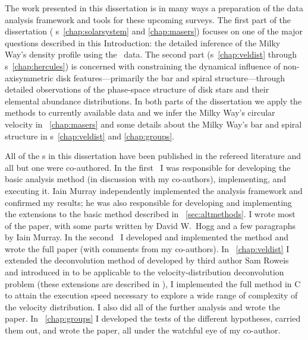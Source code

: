 The work presented in this dissertation is in many ways a preparation
of the data analysis framework and tools for these upcoming
surveys. The first part of the dissertation (\chaptername
s~\ref{chap:solarsystem} and \ref{chap:masers}) focuses on one
of the major questions described in this Introduction: the detailed
inference of the Milky Way's density profile using the \Gaia\
data. The second part (\chaptername s~\ref{chap:veldist}
through \chaptername s~\ref{chap:hercules}) is concerned with
constraining the dynamical influence of non-axisymmetric disk
features---primarily the bar and spiral structure---through detailed
observations of the phase-space structure of disk stars and their
elemental abundance distributions. In both parts of the dissertation
we apply the methods to currently available data and we infer the
Milky Way's circular velocity in \chaptername~\ref{chap:masers} and
some details about the Milky Way's bar and spiral structure
in \chaptername s~\ref{chap:veldist} and \ref{chap:groups}. 

All of the \chaptername s in this dissertation have been published in
the refereed literature and all but one were co-authored. In the
first \chaptername\ I was responsible for developing the basic
analysis method (in discussion with my co-authors), implementing, and
executing it. Iain Murray independently implemented the analysis
framework and confirmed my results; he was also responsible for
developing and implementing the extensions to the basic method
described in \sectionname~\ref{sec:altmethods}. I wrote most of the
paper, with some parts written by David W.~Hogg and a few paragraphs
by Iain Murray. In the second \chaptername\ I developed and
implemented the method and wrote the full paper (with comments from my
co-authors). In \chaptername~\ref{chap:veldist} I extended the
deconvolution method of developed by third author Sam Roweis and
introduced in \citet{Hogg05a} to be applicable to the
velocity-distribution deconvolution problem (these extensions are
described in \citealt{Bovy09?}), I implemented the full method in C to
attain the execution speed necessary to explore a wide range of
complexity of the velocity distribution. I also did all of the further
analysis and wrote the paper. In \chaptername~\ref{chap:groups} I
developed the tests of the different hypotheses, carried them out, and
wrote the paper, all under the watchful eye of my co-author.
